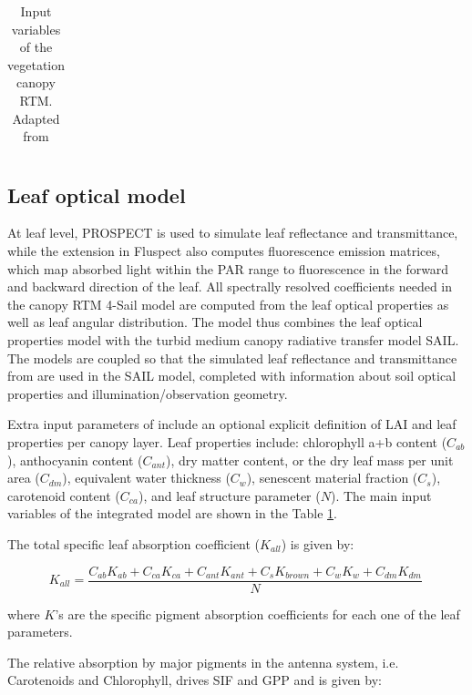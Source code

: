 \documentclass[twoside,10pt]{report}
\begin{document}
\begin{table}[]
{\begin{tabular}{llllll}
\hline
\end{tabular}%
}
\caption{Input variables of the vegetation canopy RTM. Adapted from \citet{Jacquemoud2009,Yang2017}}
\label{tab:prosail}
\end{table}


\subsection{Leaf optical model}
At leaf level, PROSPECT \citep{Jacquemoud1990,Feret2017} is used to simulate leaf reflectance and transmittance, while the extension in Fluspect \citep{Vilfan2016} also computes fluorescence emission matrices, which map absorbed light within the PAR range to fluorescence in the forward and backward direction of the leaf. All spectrally resolved coefficients needed in the canopy RTM 4-Sail model are computed from the leaf optical properties as well as leaf angular distribution. The model thus combines the leaf optical properties model \citep{Jacquemoud1990,Feret2017, Vilfan2016} with the turbid medium canopy radiative transfer model SAIL. The models are coupled so that the simulated leaf reflectance and transmittance from are used in the SAIL model, completed with information about soil optical properties and illumination/observation geometry.



 Extra input parameters of include an optional explicit definition of LAI and leaf properties per canopy layer. Leaf properties include: chlorophyll a+b content ($C_{ab}$), anthocyanin content ($C_{ant}$), dry matter content, or the dry leaf mass per unit area ($C_{dm}$), equivalent water thickness ($C_{w}$), senescent material fraction ($C_{s}$), carotenoid content ($C_{ca}$), and leaf structure parameter ($N$). The main input variables of the integrated model are shown in the Table \ref{tab:prosail}.
 
 The total specific leaf absorption coefficient ($K_{all}$) is given by:
 
 \begin{equation}
 K_{all} =  \frac{C_{ab}K_{ab} + C_{ca}K_{ca} + C_{ant}K_{ant} + C_{s}K_{brown} + C_{w}K_{w} + C_{dm}K_{dm}}{N}\,
\label{leaf_optical_properties:Kall}
\end{equation}

\noindent where $K$'s are the specific pigment absorption coefficients for each one of the leaf parameters. 

The relative absorption by major pigments in the antenna system, i.e. Carotenoids and Chlorophyll, drives SIF and GPP and is given by:
\end{document}
